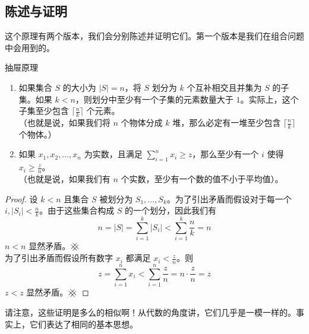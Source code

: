 
\subsection{陈述与证明}

这个原理有两个版本，我们会分别陈述并证明它们。第一个版本是我们在组合问题中会用到的。

\begin{theorem}{抽屉原理}
    \begin{enumerate}[label=(\arabic*)]
        \item 如果集合 $S$ 的大小为 $|S| = n$，将 $S$ 划分为 $k$ 个互补相交且并集为 $S$ 的子集。如果 $k < n$，则划分中至少有一个子集的元素数量大于 $1$。实际上，这个子集至少包含 $\lceil \frac{n}{k} \rceil$ 个元素。\\
              （也就是说，如果我们将 $n$ 个物体分成 $k$ 堆，那么必定有一堆至少包含 $\lceil \frac{n}{k} \rceil$ 个物体。）
        \item 如果 $x_1, x_2, \dots , x_n$ 为实数，且满足 $\sum_{i=1}^{n} x_i \ge z$，那么至少有一个 $i$ 使得 $x_i \ge \frac{z}{n}$。\\
              （也就是说，如果我们有 $n$ 个实数，至少有一个数的值不小于平均值）。
    \end{enumerate}
\end{theorem}

\begin{proof}
    设 $k<n$ 且集合 $S$ 被划分为 $S_1,\dots, S_k$。为了引出矛盾而假设对于每一个 $i, |S_i| < \frac{n}{k}$。由于这些集合构成 $S$ 的一个划分，因此我们有
    \[n = |S| = \sum_{i=1}^{k}|S_i| < \sum_{i=1}^{k} \frac{n}{k}=n\]
    $n < n$ 显然矛盾。$\hashx$\\

    为了引出矛盾而假设所有数字 $x_i$ 都满足 $x_i < \frac{z}{n}$。则
    \[z = \sum_{i=1}^{n}x_i<\sum_{i=1}^{n}\frac{z}{n}=n \cdot \frac{z}{n}=z\]
    $z < z$ 显然矛盾。$\hashx$
\end{proof}

请注意，这些证明是多么的相似啊！从代数的角度讲，它们几乎是一模一样的。事实上，它们表达了相同的基本思想。